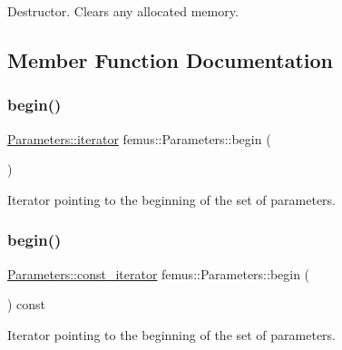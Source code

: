 Destructor. Clears any allocated memory. 

\subsection{Member Function Documentation}
\mbox{\label{classfemus_1_1_parameters_a360c1cf34dad7c0cd6a80b671d61e756}} 
\subsubsection{\texorpdfstring{begin()}{begin()}\hspace{0.1cm}{\footnotesize\ttfamily [1/2]}}
{\footnotesize\ttfamily \mbox{\hyperlink{classfemus_1_1_parameters_a2cbdfdaaa2d9438d9a6900aa62c8295b}{Parameters\+::iterator}} femus\+::\+Parameters\+::begin (\begin{DoxyParamCaption}{ }\end{DoxyParamCaption})\hspace{0.3cm}{\ttfamily [inline]}}

Iterator pointing to the beginning of the set of parameters. \mbox{\label{classfemus_1_1_parameters_abf591336eec6184e712ad320506c54a0}} 
\subsubsection{\texorpdfstring{begin()}{begin()}\hspace{0.1cm}{\footnotesize\ttfamily [2/2]}}
{\footnotesize\ttfamily \mbox{\hyperlink{classfemus_1_1_parameters_aa561fb692a63fe58dcec20374e9569c2}{Parameters\+::const\+\_\+iterator}} femus\+::\+Parameters\+::begin (\begin{DoxyParamCaption}{ }\end{DoxyParamCaption}) const\hspace{0.3cm}{\ttfamily [inline]}}

Iterator pointing to the beginning of the set of parameters. \mbox{\label{classfemus_1_1_parameters_a95450c7428fcb8db6b4ce2ff2945a317}} 
